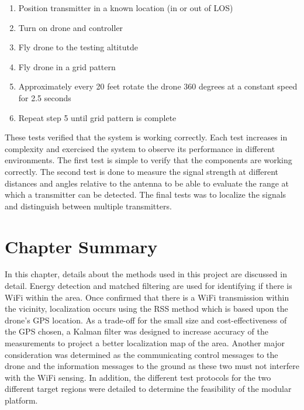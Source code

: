 \begin{enumerate}
   \item Position transmitter in a known location (in or out of LOS)
   \item Turn on drone and controller
   \item Fly drone to the testing altitutde
   \item Fly drone in a grid pattern
   \item Approximately every 20 feet rotate the drone 360 degrees at a constant speed for 2.5 seconds
   \item Repeat step 5 until grid pattern is complete
\end{enumerate} \par

These tests verified that the system is working correctly. Each test increases in complexity and exercised the system to observe its performance in different environments. The first test is simple to verify that the components are working correctly. The second test is done to measure the signal strength at different distances and angles relative to the antenna to be able to evaluate the range at which a transmitter can be detected. The final tests was to localize the signals and distinguish between multiple transmitters.

\section{Chapter Summary}
In this chapter, details about the methods used in this project are discussed in detail. Energy detection and matched filtering are used for identifying if there is WiFi within the area. Once confirmed that there is a WiFi transmission within the vicinity, localization occurs using the RSS method which is based upon the drone's GPS location. As a trade-off for the small size and cost-effectiveness of the GPS chosen, a Kalman filter was designed to increase accuracy of the measurements to project a better localization map of the area. Another major consideration was determined as the communicating control messages to the drone and the information messages to the ground as these two must not interfere with the WiFi sensing. In addition, the different test protocols for the two different target regions were detailed to determine the feasibility of the modular platform.